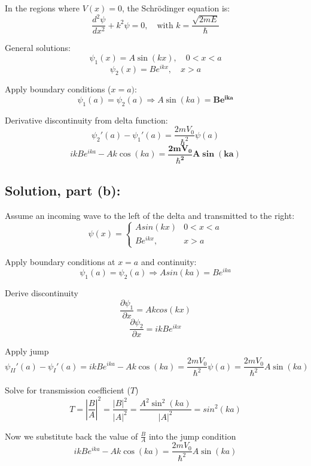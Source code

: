\documentclass[12pt]{article}
\begin{document}
        In the regions where \( V(x) = 0 \), the Schrödinger equation is:
        \[
            \frac{d^2 \psi}{dx^2} + k^2 \psi = 0, \quad \text{with } k = \frac{\sqrt{2mE}}{\hbar}
        \]
        
        General solutions:
        \[
            \psi_1(x) = A \sin(kx), \quad 0 < x < a
        \]
        \[
            \psi_2(x) = B e^{ikx}, \quad x > a
        \]
        
        Apply boundary conditions ($x=a)$:
        \[
        \psi_1(a) = \psi_2(a) \Rightarrow A \sin(ka) = \boldsymbol{\boxed{B e^{ika}}}
        \]    
        
        Derivative discontinuity from delta function:
        \[
            \psi_2'(a) - \psi_1'(a) = \frac{2m V_0}{\hbar^2} \psi(a)
        \]
        \[
            ik B e^{ika} - A k \cos(ka) = \boldsymbol{\boxed{\frac{2m V_0}{\hbar^2} A \sin(ka)}}
        \]
        

    \subsection{Solution, part (b):}
        Assume an incoming wave to the left of the delta and transmitted to the right:
        \[
            \psi(x) =
            \begin{cases}
                Asin(kx) & 0 < x < a \\
                B e^{ikx}, & x > a
            \end{cases}
        \]
        
        Apply boundary conditions at \( x = a \) and continuity:
        \[
            \psi_1(a) = \psi_2(a) \Rightarrow Asin(ka) = Be^{ika}
        \]
        
        Derive discontinuity
        \[
            \frac{\partial \psi_1}{\partial x} = A k cos(kx)
        \]
        \[
            \frac{\partial \psi_2}{\partial x} = i k B e^{ikx}
        \]
        
        Apply jump
        \[
            \psi_{II}'(a) - \psi_{I}'(a) 
            = i k B e^{ika} - A k \cos(ka) 
            = \frac{2m V_0}{\hbar^2} \psi(a) 
            = \frac{2m V_0}{\hbar^2} A \sin(ka)
        \]

        Solve for transmission coefficient ($T$)
        \[
            T = \left| \frac{B}{A} \right|^2 = \frac{|B|^2}{|A|^2} = \frac{A^2 \sin^2(ka)}{|A|^2} = sin^2(ka)
        \]

        Now we substitute back the value of $\frac{B}{A}$ into the jump condition
        \[
            i k B e^{ika} - A k \cos(ka) = \frac{2m V_0}{\hbar^2} A \sin(ka)
        \]
        
\end{document}
